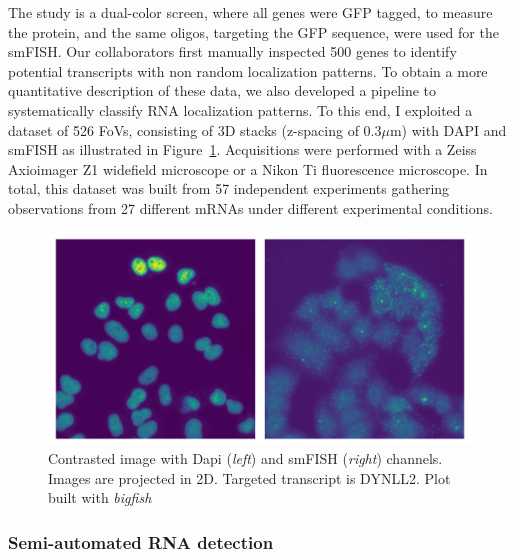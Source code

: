 The study is a dual-color screen, where all genes were GFP tagged, to measure the protein, and the same oligos, targeting the GFP sequence, were used for the \ac{smFISH}.
Our collaborators first manually inspected 500 genes to identify potential transcripts with non random localization patterns.
To obtain a more quantitative description of these data, we also developed a pipeline to systematically classify \ac{RNA} localization patterns.
To this end, I exploited a dataset of 526 \ac{FoV}s, consisting of 3D stacks (z-spacing of 0.3$\mu$m) with DAPI and \ac{smFISH} as illustrated in Figure~\ref{fig:fov_racha}.
Acquisitions were performed with a Zeiss Axioimager Z1 widefield microscope or a Nikon Ti fluorescence microscope.
In total, this dataset was built from 57 independent experiments gathering observations from 27 different \ac{mRNA}s under different experimental conditions.

\begin{figure}[]
    \centering
    \includegraphics[width=\textwidth]{figures/chapter5/FoV_DYNLL2}
    \caption[Contrasted image with Dapi and smFISH channels]{Contrasted image with Dapi (\textit{left}) and smFISH (\textit{right}) channels.
	Images are projected in 2D.
	Targeted transcript is DYNLL2.
	Plot built with \emph{bigfish}}
    \label{fig:fov_racha}
\end{figure}

\subsubsection{Semi-automated RNA detection}

